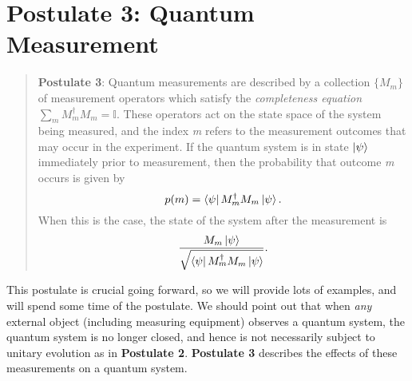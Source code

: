 \section{Postulate 3: Quantum Measurement} \label{section: postulate 3}



\begin{quote}
    \textbf{Postulate 3}: Quantum measurements are described by a collection $\{M_m\}$ of measurement operators which satisfy the {\emph{completeness equation}} $\sum\limits_m M_m^\dagger M_m =\mathbb{I}$. These operators act on the state space of the system being measured, and the index {\emph{m}} refers to the measurement outcomes that may occur in the experiment. If the quantum system is in state $\ket{\psi}$ immediately prior to measurement, then the probability that outcome {\emph{m}} occurs is given by 
    \begin{equation} \label{eqn: general measurement probability}
        p(m)=\bra{\psi}M_m^\dagger M_m \ket{\psi}.
    \end{equation} 
   When this is the case, the state of the system after the measurement is
    \begin{equation} \label{eqn: general measurement post state}
        \frac{M_m \ket{\psi}}{\sqrt{\bra{\psi}M_m^\dagger M_m \ket{\psi}}}.
    \end{equation}

\end{quote}




This postulate is crucial going forward, so we will provide lots of examples, and will spend some time of the postulate.  We should point out that when {\emph{any}} external object (including measuring equipment) observes a quantum system, the quantum system is no longer closed, and hence is not necessarily subject to unitary evolution as in {\bf{Postulate 2}}. {\bf{Postulate 3}} describes the effects of these measurements on a quantum system. 

